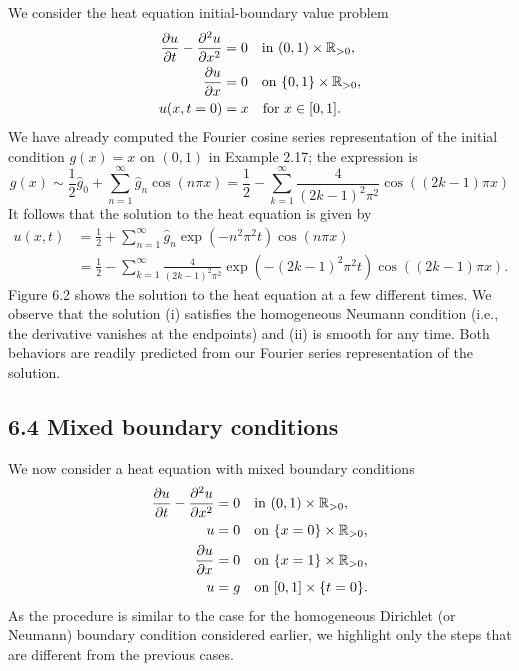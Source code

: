 \begin{example}
    We consider the heat equation initial-boundary value problem
    \begin{align*}
        \frac{\partial u}{\partial t} - \frac{\partial^2 u}{\partial x^2} &= 0 \quad \text{in } (0, 1) \times \mathbb{R}_{>0}, \\
        \frac{\partial u}{\partial x} &= 0 \quad \text{on } \{0, 1\} \times \mathbb{R}_{>0}, \\
        u(x, t = 0) &= x \quad \text{for } x \in [0, 1].
    \end{align*}
    We have already computed the Fourier cosine series representation of the initial condition $g(x) = x$ on $(0, 1)$ in Example 2.17; the expression is
    \[g(x) \sim \frac{1}{2} \hat{g}_0 + \sum_{n=1}^{\infty} \hat{g}_n \cos(n\pi x) = \frac{1}{2} - \sum_{k=1}^{\infty} \frac{4}{(2k - 1)^2\pi^2} \cos((2k - 1)\pi x)\]
    It follows that the solution to the heat equation is given by
    \begin{align*}
        u(x, t) &= \frac{1}{2} + \sum_{n=1}^{\infty} \hat{g}_n \exp(-n^2\pi^2 t) \cos(n\pi x) \\
        &= \frac{1}{2} - \sum_{k=1}^{\infty} \frac{4}{(2k - 1)^2\pi^2} \exp(-(2k - 1)^2\pi^2 t) \cos((2k - 1)\pi x).
    \end{align*}
    Figure 6.2 shows the solution to the heat equation at a few different times. We observe that the solution (i) satisfies the homogeneous Neumann condition (i.e., the derivative vanishes at the endpoints) and (ii) is smooth for any time. Both behaviors are readily predicted from our Fourier series representation of the solution.
\end{example}


\subsection{6.4 Mixed boundary conditions}
We now consider a heat equation with mixed boundary conditions
\begin{align*}
    \frac{\partial u}{\partial t} - \frac{\partial^2 u}{\partial x^2} &= 0 \quad \text{in } (0, 1) \times \mathbb{R}_{>0}, \\
    u &= 0 \quad \text{on } \{x = 0\} \times \mathbb{R}_{>0}, \\
    \frac{\partial u}{\partial x} &= 0 \quad \text{on } \{x = 1\} \times \mathbb{R}_{>0}, \\
    u &= g \quad \text{on } [0, 1] \times \{t = 0\}.
\end{align*}
As the procedure is similar to the case for the homogeneous Dirichlet (or Neumann) boundary condition considered earlier, we highlight only the steps that are different from the previous cases.

